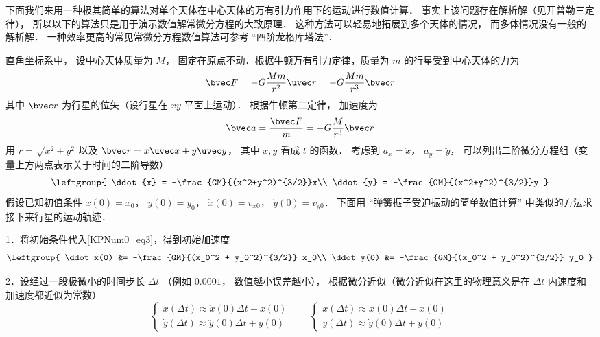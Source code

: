 

下面我们来用一种极其简单的算法对单个天体在中心天体的万有引力作用下的运动进行数值计算． 事实上该问题存在解析解（见开普勒三定律）， 所以以下的算法只是用于演示数值解常微分方程的大致原理． 这种方法可以轻易地拓展到多个天体的情况， 而多体情况没有一般的解析解． 一种效率更高的常见常微分方程数值算法可参考 “四阶龙格库塔法”．

直角坐标系中， 设中心天体质量为 $M$， 固定在原点不动．根据牛顿万有引力定律，质量为 $m$ 的行星受到中心天体的力为
\begin{equation}
\bvec F = -G \frac{Mm}{r^2}\uvec r = -G\frac{Mm}{r^3} \bvec r
\end{equation}
其中 $\bvec r$ 为行星的位矢（设行星在 $xy$ 平面上运动）． 根据牛顿第二定律， 加速度为
\begin{equation}
\bvec a = \frac{\bvec F}{m} = -G\frac{M}{r^3} \bvec r
\end{equation}
用 $r = \sqrt{x^2+y^2}$ 以及 $\bvec r = x\uvec x + y\uvec y$， 其中 $x,y$ 看成 $t$ 的函数． 考虑到 $a_x = \ddot x$， $a_y = \ddot y$， 可以列出二阶微分方程组（变量上方两点表示关于时间的二阶导数）
\begin{equation}\label{KPNum0_eq3}
\leftgroup{
\ddot{x} = -\frac{GM}{(x^2+y^2)^{3/2}}x\\
\ddot{y} = -\frac{GM}{(x^2+y^2)^{3/2}}y
}\end{equation}
假设已知初值条件 $x(0) = x_0$， $y(0) = y_0$， $\dot x(0) = v_{x0}$， $\dot y(0) = v_{y0}$． 下面用 “弹簧振子受迫振动的简单数值计算” 中类似的方法求接下来行星的运动轨迹．

1．将初始条件代入\autoref{KPNum0_eq3}，得到初始加速度
\begin{equation}
\leftgroup{
\ddot x(0) &= -\frac{GM}{(x_0^2 + y_0^2)^{3/2}} x_0\\
\ddot y(0) &= -\frac{GM}{(x_0^2 + y_0^2)^{3/2}} y_0
}
\end{equation}
 
2．设经过一段极微小的时间步长 $\Delta t$ （例如 $0.0001$， 数值越小误差越小）， 根据微分近似（微分近似在这里的物理意义是在 $\Delta t$ 内速度和加速度都近似为常数）
\begin{equation}
\begin{cases}
\dot x(\Delta t) \approx \ddot x(0)\Delta t + x(0)\\
\dot y(\Delta t) \approx \ddot y(0)\Delta t + \dot y(0)
\end{cases}
\qquad
\begin{cases}
x(\Delta t) \approx \dot x(0)\Delta t + x(0)\\
y(\Delta t) \approx \dot y(0)\Delta t + y(0)
\end{cases}
\end{equation}

